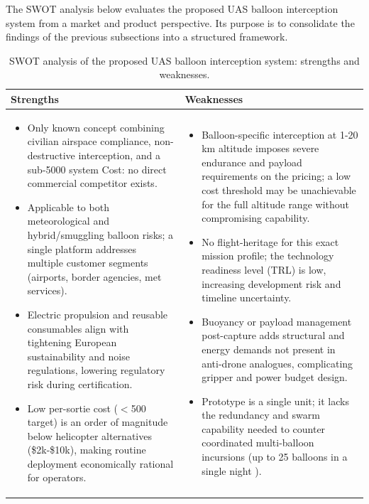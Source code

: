 The SWOT analysis below evaluates the proposed UAS balloon interception system from a market and product perspective. Its purpose is to consolidate the findings of the previous subsections into a structured framework.
\begin{table}[H]
\centering
\caption{SWOT analysis of the proposed UAS balloon interception system: strengths and weaknesses.}
\vspace{-10pt}
\label{tab:swot_strengths_weaknesses}
\begin{tabular}{@{}p{7.6cm}|p{7.6cm}@{}}
\toprule
\textbf{Strengths} & \textbf{Weaknesses} \\
\midrule
\vspace{-0.7\baselineskip}
\begin{itemize}[leftmargin=*,nosep,topsep=0pt,partopsep=0pt]
  \item Only known concept combining civilian airspace compliance,
        non-destructive interception, and a sub-\texteuro{}5000 system
        Cost: no direct commercial competitor exists.
  \item Applicable to both meteorological and hybrid/smuggling balloon
        risks; a single platform addresses multiple customer segments
        (airports, border agencies, met services).
  \item Electric propulsion and reusable consumables align with tightening European sustainability and noise regulations, lowering regulatory risk during certification.
  \item Low per-sortie cost (\texteuro{}$<$500 target) is an order of magnitude below helicopter alternatives (\$2k-\$10k), making routine deployment economically rational for operators.
\end{itemize}
&
\vspace{-0.7\baselineskip}
\begin{itemize}[leftmargin=*,nosep,topsep=0pt,partopsep=0pt]
  \item Balloon-specific interception at 1-20 km altitude imposes severe endurance and payload requirements on the pricing; a low cost threshold may be unachievable for the full altitude range without compromising capability.
  \item No flight-heritage for this exact mission profile; the technology readiness level (TRL) is low, increasing development risk and timeline uncertainty.
  \item Buoyancy or payload management post-capture adds structural and energy demands not present in anti-drone analogues, complicating gripper and power budget design.
  \item Prototype is a single unit; it lacks the redundancy and swarm capability needed to counter coordinated multi-balloon incursions (up to 25 balloons in a single night \cite{RFE/RLBelarusService2025UpBoth}).
\end{itemize}
\\
\bottomrule
\end{tabular}
\end{table}
